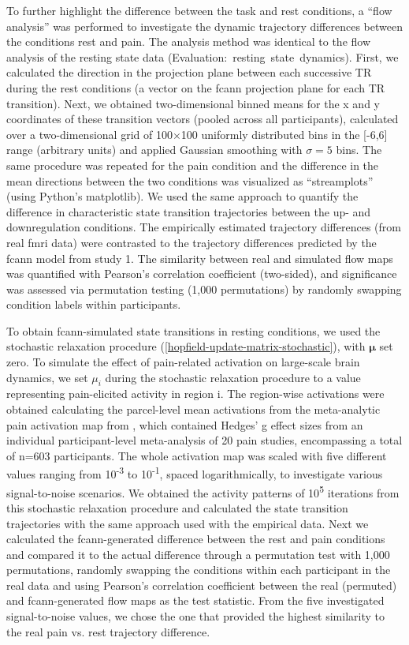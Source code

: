 \documentclass{article}
\begin{document}
To further highlight the difference between the task and rest conditions, a ``flow analysis'' was performed to investigate the dynamic trajectory differences between the conditions rest and pain. The analysis method was identical to the flow analysis of the resting state data (Evaluation:~resting~state~dynamics). First, we calculated the direction in the projection plane between each successive TR during the rest conditions (a vector on the \acrshort{fcann} projection plane for each TR transition). Next, we obtained two-dimensional binned means for the x and y coordinates of these transition vectors (pooled across all participants), calculated over a two-dimensional grid of 100$\times$100 uniformly distributed bins in the [-6,6] range (arbitrary units) and applied Gaussian smoothing with $\sigma=5$ bins.
The same procedure was repeated for the pain condition and the difference in the mean directions between the two conditions was visualized as ``streamplots'' (using Python's matplotlib). We used the same approach to quantify the difference in characteristic state transition trajectories between the up- and downregulation conditions. The empirically estimated trajectory differences (from real \acrshort{fmri} data) were contrasted to the trajectory differences predicted by the \acrshort{fcann} model from study 1. The similarity between real and simulated flow maps was quantified with Pearson's correlation coefficient (two-sided), and significance was assessed via permutation testing (1,000 permutations) by randomly swapping condition labels within participants.

To obtain \acrshort{fcann}-simulated state transitions in resting conditions, we used the stochastic relaxation procedure (\ref{hopfield-update-matrix-stochastic}), with $\mathbf{\mu}$ set zero.
To simulate the effect of pain-related activation on large-scale brain dynamics, we set $\mu_i$ during the stochastic relaxation procedure to a value representing pain-elicited activity in region i. The region-wise activations were obtained calculating the parcel-level mean activations from the meta-analytic pain activation map from \citep{zunhammer2021meta}, which contained Hedges' g effect sizes from an individual participant-level meta-analysis of 20 pain studies, encompassing a total of n=603 participants. The whole activation map was scaled with five different values ranging from 10\textsuperscript{-3} to 10\textsuperscript{-1}, spaced logarithmically, to investigate various signal-to-noise scenarios.
We obtained the activity patterns of 10\textsuperscript{5} iterations from this stochastic relaxation procedure and calculated the state transition trajectories with the same approach used with the empirical data.
Next we calculated the \acrshort{fcann}-generated difference between the rest and pain conditions and compared it to the actual difference through a permutation test with 1,000 permutations, randomly swapping the conditions within each participant in the real data and using Pearson's correlation coefficient between the real (permuted) and \acrshort{fcann}-generated flow maps as the test statistic.
From the five investigated signal-to-noise values, we chose the one that provided the highest similarity to the real pain vs. rest trajectory difference.
\end{document}
